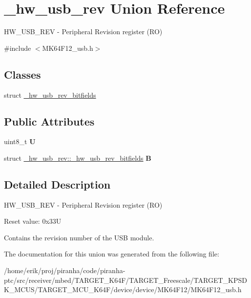\hypertarget{union__hw__usb__rev}{}\section{\+\_\+hw\+\_\+usb\+\_\+rev Union Reference}
\label{union__hw__usb__rev}


H\+W\+\_\+\+U\+S\+B\+\_\+\+R\+EV -\/ Peripheral Revision register (RO)  




{\ttfamily \#include $<$M\+K64\+F12\+\_\+usb.\+h$>$}

\subsection*{Classes}
\begin{DoxyCompactItemize}
\item 
struct \hyperlink{struct__hw__usb__rev_1_1__hw__usb__rev__bitfields}{\+\_\+hw\+\_\+usb\+\_\+rev\+\_\+bitfields}
\end{DoxyCompactItemize}
\subsection*{Public Attributes}
\begin{DoxyCompactItemize}
\item 
uint8\+\_\+t {\bfseries U}\hypertarget{union__hw__usb__rev_a92319f1dc1ad5ab16b982197ca3b4605}{}\label{union__hw__usb__rev_a92319f1dc1ad5ab16b982197ca3b4605}

\item 
struct \hyperlink{struct__hw__usb__rev_1_1__hw__usb__rev__bitfields}{\+\_\+hw\+\_\+usb\+\_\+rev\+::\+\_\+hw\+\_\+usb\+\_\+rev\+\_\+bitfields} {\bfseries B}\hypertarget{union__hw__usb__rev_a9e01c37f3236b464cf3cf82a156922ba}{}\label{union__hw__usb__rev_a9e01c37f3236b464cf3cf82a156922ba}

\end{DoxyCompactItemize}


\subsection{Detailed Description}
H\+W\+\_\+\+U\+S\+B\+\_\+\+R\+EV -\/ Peripheral Revision register (RO) 

Reset value\+: 0x33U

Contains the revision number of the U\+SB module. 

The documentation for this union was generated from the following file\+:\begin{DoxyCompactItemize}
\item 
/home/erik/proj/piranha/code/piranha-\/ptc/src/receiver/mbed/\+T\+A\+R\+G\+E\+T\+\_\+\+K64\+F/\+T\+A\+R\+G\+E\+T\+\_\+\+Freescale/\+T\+A\+R\+G\+E\+T\+\_\+\+K\+P\+S\+D\+K\+\_\+\+M\+C\+U\+S/\+T\+A\+R\+G\+E\+T\+\_\+\+M\+C\+U\+\_\+\+K64\+F/device/device/\+M\+K64\+F12/M\+K64\+F12\+\_\+usb.\+h\end{DoxyCompactItemize}
